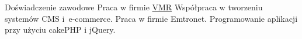 \begin{rubric}{Doświadczenie zawodowe}
Praca w firmie \href{http://vmr.pl/}{VMR} 
Współpraca w tworzeniu systemów CMS i~\hbox{e-commerce}.
Praca w firmie Emtronet. Programowanie
aplikacji przy użyciu cakePHP i jQuery.
\end{rubric}

